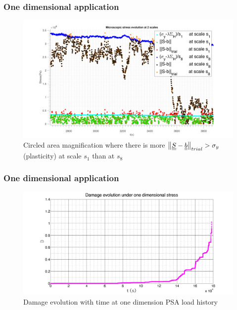 \documentclass[xcolor=table]{Bredelebeamer}
\begin{document}
\begin{frame}
	\frametitle{One dimensional application}
	\begin{figure}[!h]
		\centering
		\includegraphics[width=\textwidth]{figures//trialreal1d2.png} 
		\caption{Circled area magnification where there is more $\left\| \uline{\uline{S}}-\uline{\uline{b}}\right\|_{trial}>\sigma_y$(plasticity) at scale $s_1$ than at $s_8$}
		\label{trialreal1d3}
	\end{figure}
\end{frame}	

\begin{frame}
	\frametitle{One dimensional application}
\begin{figure}[!h]
	\centering
	\includegraphics[width=\textwidth]{figures//damage1d.png} 
	\caption{Damage evolution with time at one dimension PSA load history}
	\label{damage1d}
\end{figure}
\end{frame}	
\end{document}
